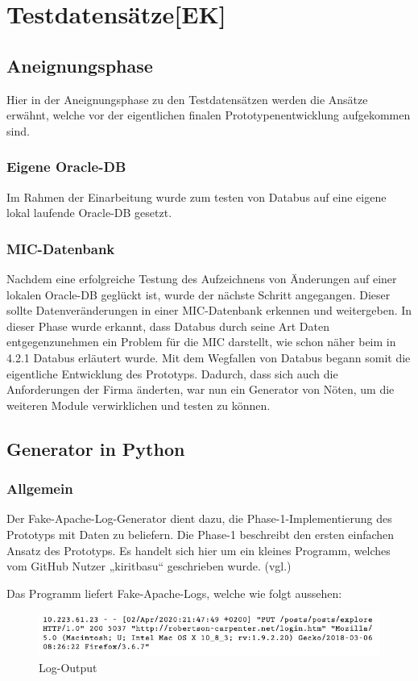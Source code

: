 \section{Testdatensätze[EK]}
\subsection{Aneignungsphase}
Hier in der Aneignungsphase zu den Testdatensätzen werden die Ansätze erwähnt, welche vor der eigentlichen finalen Prototypenentwicklung aufgekommen sind.
\subsubsection{Eigene Oracle-DB}
Im Rahmen der Einarbeitung wurde zum testen von Databus auf eine eigene lokal laufende  Oracle-DB gesetzt. 
\subsubsection{MIC-Datenbank}
Nachdem eine erfolgreiche Testung des Aufzeichnens von Änderungen auf einer lokalen Oracle-DB geglückt ist, wurde der nächste Schritt angegangen. Dieser sollte Datenveränderungen in einer MIC-Datenbank erkennen und weitergeben. In dieser Phase wurde erkannt, dass Databus durch seine Art Daten entgegenzunehmen ein Problem für die MIC darstellt, wie schon näher beim  in 4.2.1 Databus erläutert wurde. Mit dem Wegfallen von Databus begann somit die eigentliche Entwicklung des Prototyps. Dadurch, dass sich auch die Anforderungen der Firma änderten, war nun ein Generator von Nöten, um die weiteren Module verwirklichen und testen zu können.
\newpage

\subsection{Generator in Python}
\subsubsection{Allgemein}
Der Fake-Apache-Log-Generator dient dazu, die Phase-1-Implementierung des Prototyps mit Daten zu beliefern. Die Phase-1 beschreibt den ersten einfachen Ansatz des Prototyps. Es handelt sich hier um ein kleines Programm, welches vom GitHub Nutzer „kiritbasu“ geschrieben wurde. (vgl.\cite{Fake-Apache-Log-Generator})
\vspace{5mm}\par
Das Programm liefert Fake-Apache-Logs, welche wie folgt aussehen:
\begin{figure}[H]
    \centering
    \includegraphics[scale=0.55]{images/apache-faker.png}
    \caption{Log-Output}
\end{figure}
